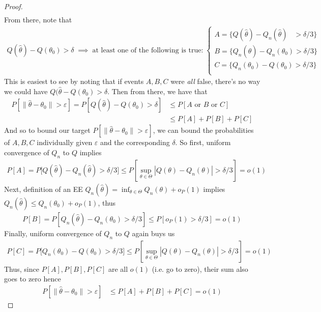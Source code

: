 \documentclass[12pt]{article}
\theoremstyle{plain}
\theoremstyle{definition}
\theoremstyle{remark}
\begin{document}
\begin{proof}
\begin{align*}
\end{align*}
From there, note that
\begin{align*}
  Q(\hat{\theta}) - Q(\theta_0) > \delta
  \;\implies\;
  \text{at least one of the following is true:}
  \;
  \begin{cases}
    A= \{Q(\hat{\theta}) - Q_n(\hat{\theta}) \;\;\;> \delta/3\}\\
    B= \{Q_n(\hat{\theta}) - Q_n(\theta_0) > \delta/3 \}\\
    C = \{Q_n(\theta_0) - Q(\theta_0) > \delta/3\} \\
  \end{cases}
\end{align*}
This is easiest to see by noting that if events $A,B,C$ were \emph{all}
false, there's no way we could have $Q(\hat{\theta}-Q(\theta_0)>\delta$.
Then from there, we have that
\begin{align*}
  P[\lVert\hat{\theta}-\theta_0\rVert>\varepsilon]
  =
  P[Q(\hat{\theta}) - Q(\theta_0) > \delta]
  &\leq P[\text{$A$ or $B$ or $C$}] \\
  &\leq P[A]+P[B]+P[C]
\end{align*}
And so to bound our target
$P[ \lVert\hat{\theta}-\theta_0\rVert > \varepsilon ]$,
we can bound the probabilities of $A,B,C$ individually given
$\varepsilon$ and the corresponding $\delta$.
So first, uniform convergence of $Q_n$ to $Q$ implies
\begin{align*}
  P[A]
  =
  P\big[Q(\hat{\theta})-Q_n(\hat{\theta})>\delta/3\big]
  \leq
  P\left[\sup_{\theta\in\Theta} |Q(\theta)-Q_n(\theta)|>\delta/3\right]
  =
  o(1)
\end{align*}
Next, definition of an EE
$Q_n(\hat{\theta})=\inf_{\theta\in\Theta}Q_n(\theta)+o_P(1)$
implies $Q_n(\hat{\theta})\leq Q_n(\theta_0)+o_P(1)$, thus
\begin{align*}
  P[B]
  =
  P[Q_n(\hat{\theta})-Q_n(\theta_0)>\delta/3]
  \leq
  P[o_P(1)>\delta/3]
  =
  o(1)
\end{align*}
Finally, uniform convergence of $Q_n$ to $Q$ again buys us
\begin{align*}
  P[C]
  =
  P\big[Q_n(\theta_0)-Q(\theta_0)>\delta/3\big]
  \leq
  P\left[\sup_{\theta\in\Theta} |Q(\theta)-Q_n(\theta)|>\delta/3\right]
  =
  o(1)
\end{align*}
Thus, since $P[A],P[B],P[C]$ are all $o(1)$ (i.e. go to zero), their sum
also goes to zero hence
\begin{align*}
  P[\lVert\hat{\theta}-\theta_0\rVert>\varepsilon]
  &\leq P[A]+P[B]+P[C]
  = o(1)
\end{align*}
\end{proof}
\end{document}
